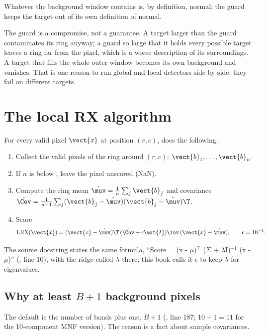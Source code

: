 \begin{keypoint}
Whatever the background window contains is, by definition, normal; the guard keeps the target out of
its own definition of normal.
\end{keypoint}

The guard is a compromise, not a guarantee. A target larger than the guard contaminates its ring
anyway; a guard so large that it holds every possible target leaves a ring far from the pixel, which
is a worse description of its surroundings. A target that fills the whole outer window becomes its own
background and vanishes. That is one reason to run global and local detectors side by side: they fail
on different targets.

\section{The local RX algorithm}\label{sec:localrx:algorithm}

For every valid pixel $\vect{x}$ at position $(r, c)$,  does the following.
\begin{enumerate}
  \item Collect the valid pixels of the ring around $(r, c)$: $\vect{b}_1, \dots, \vect{b}_n$.
  \item If $n$ is below , leave the pixel unscored (NaN).
  \item Compute the ring mean $\hat\muv = \frac1n\sum_j\vect{b}_j$ and covariance
    $\hat\Cov = \frac{1}{n - 1}\sum_j(\vect{b}_j - \hat\muv)(\vect{b}_j - \hat\muv)\T$.
  \item Score
  \begin{equation}\label{eq:localrx:lrx}
  \text{LRX}(\vect{x}) = (\vect{x} - \hat\muv)\T\,(\hat\Cov + \epsilon\mat{I})\inv\,(\vect{x} - \hat\muv),
  \qquad \epsilon = 10^{-4}.
  \end{equation}
\end{enumerate}
The source docstring states the same formula, ``Score = (x - $\mu$)$^\top$ ($\Sigma$ + $\lambda$I)$^{-1}$ (x -
$\mu$)'' (, line 10), with the ridge called $\lambda$ there; this book calls it
$\epsilon$ to keep $\lambda$ for eigenvalues.

\subsection{Why at least $B + 1$ background pixels}

The default  is the number of bands plus one, $B + 1$ (,
line 187; $10 + 1 = 11$ for the 10-component MNF version). The reason is a fact about sample
covariances.

